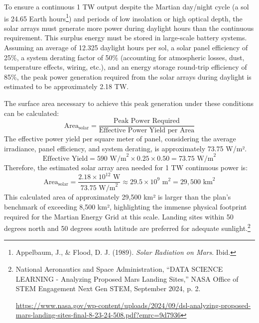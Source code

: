 \documentclass[fontsize=10pt, oneside, DIV=calc]{scrartcl}
\begin{document}
\medskip

\noindent
To ensure a continuous 1 TW output despite the Martian day/night cycle (a sol is 24.65 Earth hours\footnote{Appelbaum, J., \& Flood, D. J. (1989). \textit{Solar Radiation on Mars}. Ibid.}) and periods of low insolation or high optical depth, the solar arrays must generate more power during daylight hours than the continuous requirement. This surplus energy must be stored in large-scale battery systems. Assuming an average of 12.325 daylight hours per sol, a solar panel efficiency of 25\%, a system derating factor of 50\% (accounting for atmospheric losses, dust, temperature effects, wiring, etc.), and an energy storage round-trip efficiency of 85\%, the peak power generation required from the solar arrays during daylight is estimated to be approximately 2.18 TW.

\medskip

\noindent
The surface area necessary to achieve this peak generation under these conditions can be calculated:
\begin{equation}
\text{Area}_{\text{solar}} = \frac{\text{Peak Power Required}}{\text{Effective Power Yield per Area}}
\end{equation}
The effective power yield per square meter of panel, considering the average irradiance, panel efficiency, and system derating, is approximately 73.75 W/m².
\begin{equation}
\text{Effective Yield} = 590 \text{ W/m}^2 \times 0.25 \times 0.50 = 73.75 \text{ W/m}^2
\end{equation}
Therefore, the estimated solar array area needed for 1 TW continuous power is:
\begin{equation}
\text{Area}_{\text{solar}} = \frac{2.18 \times 10^{12} \text{ W}}{73.75 \text{ W/m}^2} \approx 29.5 \times 10^9 \text{ m}^2 = 29,500 \text{ km}^2
\end{equation}
This calculated area of approximately 29,500 km² is larger than the plan's benchmark of exceeding 8,500 km², highlighting the immense physical footprint required for the Martian Energy Grid at this scale. Landing sites within 50 degrees north and 50 degrees south latitude are preferred for adequate sunlight.\footnote{National Aeronautics and Space Administration, ``DATA SCIENCE LEARNING - Analyzing Proposed Mars Landing Sites,'' NASA Office of STEM Engagement Next Gen STEM, September 2024, p. 2. 







\href{https://www.nasa.gov/wp-content/uploads/2024/09/dsl-analyzing-proposed-mars-landing-sites-final-8-23-24-508.pdf?emrc=9d7936}\url{https://www.nasa.gov/wp-content/uploads/2024/09/dsl-analyzing-proposed-mars-landing-sites-final-8-23-24-508.pdf?emrc=9d7936}}
\end{document}

